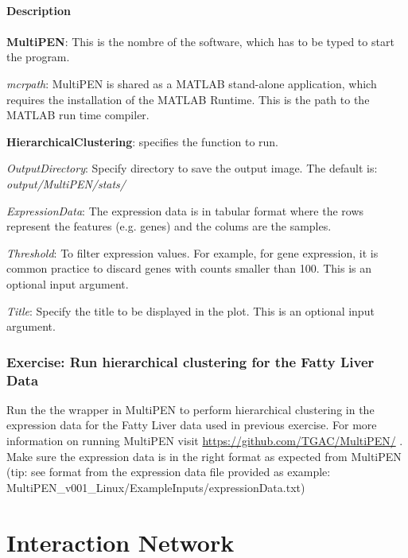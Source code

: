 \documentclass[11pt, oneside]{article}   	%
\begin{document}
\paragraph{Description}
\paragraph{}


{\bf MultiPEN}:  This is the nombre of the software, which has to be typed to start the program.

{\it mcrpath}: MultiPEN is shared as a MATLAB stand-alone application, which requires the installation of the MATLAB Runtime. This is the path to the MATLAB run time compiler.

{\bf HierarchicalClustering}: specifies the function to run.

{\it OutputDirectory}:  Specify directory to save the output image. The default is: {\it output/MultiPEN/stats/} 

{\it ExpressionData}: The expression data is in tabular format where the rows represent the features (e.g. genes) and the colums are the samples. 

{\it Threshold}: To filter expression values. For example, for gene expression, it is common practice to discard genes with counts smaller than 100. This is an optional input argument.

{\it Title}: Specify the title to be displayed in the plot. This is an optional input argument.




\subsubsection{Exercise: Run hierarchical clustering for the Fatty Liver Data \cite{Wruck2015}}

Run the the wrapper in MultiPEN to perform hierarchical clustering in the expression data for the Fatty Liver data \cite{Wruck2015} used in previous exercise. For more information on running MultiPEN visit \url{https://github.com/TGAC/MultiPEN/} \cite{Rey2017}. Make sure the expression data is in the right format as expected from MultiPEN (tip: see format from the expression data file provided as example: MultiPEN\_v001\_Linux/ExampleInputs/expressionData.txt)




\section{Interaction Network}
\end{document}
